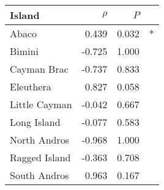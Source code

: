 
\begin{tabular}{lrrl}
\toprule
Island & $\rho$ & $P$ & \\
\midrule
Abaco & 0.439 & 0.032 & *\\
Bimini & -0.725 & 1.000 & \\
Cayman Brac & -0.737 & 0.833 & \\
Eleuthera & 0.827 & 0.058 & \\
Little Cayman & -0.042 & 0.667 & \\
Long Island & -0.077 & 0.583 & \\
North Andros & -0.968 & 1.000 & \\
Ragged Island & -0.363 & 0.708 & \\
South Andros & 0.963 & 0.167 & \\
\bottomrule
\end{tabular}